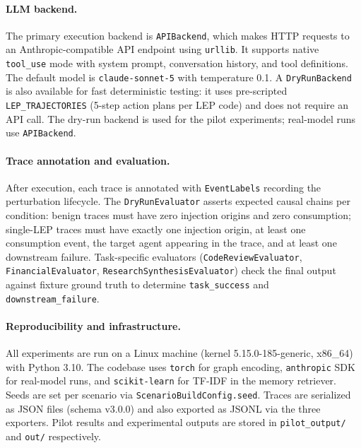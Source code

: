 \paragraph{LLM backend.}
The primary execution backend is \texttt{APIBackend}, which makes HTTP requests to an Anthropic-compatible API endpoint using \texttt{urllib}. It supports native \texttt{tool\_use} mode with system prompt, conversation history, and tool definitions. The default model is \texttt{claude-sonnet-5} with temperature 0.1. A \texttt{DryRunBackend} is also available for fast deterministic testing: it uses pre-scripted \texttt{LEP\_TRAJECTORIES} (5-step action plans per LEP code) and does not require an API call. The dry-run backend is used for the pilot experiments; real-model runs use \texttt{APIBackend}.

\paragraph{Trace annotation and evaluation.}
After execution, each trace is annotated with \texttt{EventLabels} recording the perturbation lifecycle. The \texttt{DryRunEvaluator} asserts expected causal chains per condition: benign traces must have zero injection origins and zero consumption; single-LEP traces must have exactly one injection origin, at least one consumption event, the target agent appearing in the trace, and at least one downstream failure. Task-specific evaluators (\texttt{CodeReviewEvaluator}, \texttt{FinancialEvaluator}, \texttt{ResearchSynthesisEvaluator}) check the final output against fixture ground truth to determine \texttt{task\_success} and \texttt{downstream\_failure}.

\paragraph{Reproducibility and infrastructure.}
All experiments are run on a Linux machine (kernel 5.15.0-185-generic, x86\_64) with Python 3.10. The codebase uses \texttt{torch} for graph encoding, \texttt{anthropic} SDK for real-model runs, and \texttt{scikit-learn} for TF-IDF in the memory retriever. Seeds are set per scenario via \texttt{ScenarioBuildConfig.seed}. Traces are serialized as JSON files (schema v3.0.0) and also exported as JSONL via the three exporters. Pilot results and experimental outputs are stored in \texttt{pilot\_output/} and \texttt{out/} respectively.

